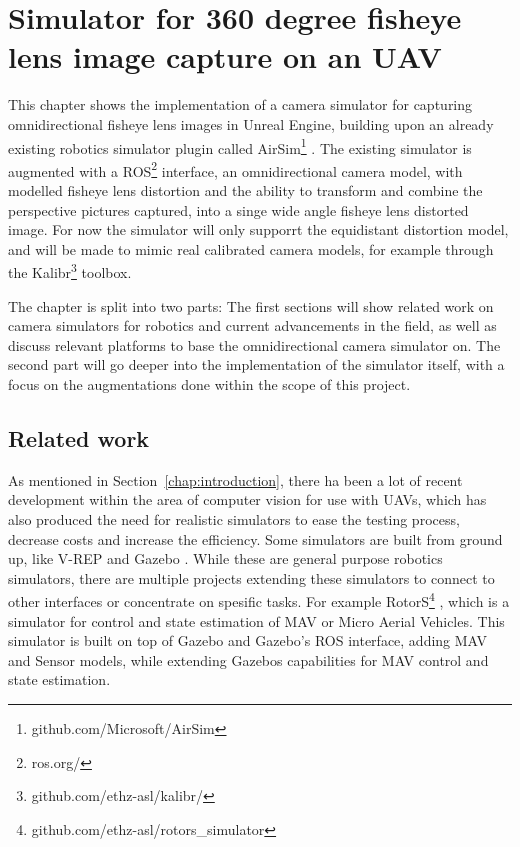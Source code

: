 
\chapter{Simulator for 360 degree fisheye lens image capture on an UAV}

This chapter shows the implementation of a camera simulator for capturing omnidirectional fisheye lens images in Unreal Engine, building upon an already existing robotics simulator plugin called AirSim\footnote{github.com/Microsoft/AirSim} \cite{Airsim_paper}. The existing simulator is augmented with a ROS\footnote{ros.org/} interface, an omnidirectional camera model, with modelled fisheye lens distortion and the ability to transform and combine the perspective pictures captured, into a singe wide angle fisheye lens distorted image. For now the simulator will only supporrt the equidistant distortion model, and will be made to mimic real calibrated camera models, for example through the Kalibr\footnote{github.com/ethz-asl/kalibr/} toolbox.

The chapter is split into two parts: The first sections will show related work on camera simulators for robotics and current advancements in the field, as well as discuss relevant platforms to base the omnidirectional camera simulator on. The second part will go deeper into the implementation of the simulator itself, with a focus on the augmentations done within the scope of this project.

\section{Related work} \label{sec:simulator_related}

As mentioned in Section~\ref{chap:introduction}, there ha been a lot of recent development within the area of computer vision for use with UAVs, which has also produced the need for realistic simulators to ease the testing process, decrease costs and increase the efficiency. Some simulators are built from ground up, like V-REP \cite{VREP2013} and Gazebo \cite{GazeboPaper}. While these are general purpose robotics simulators, there are multiple projects extending these simulators to connect to other interfaces or concentrate on spesific tasks. For example RotorS\footnote{github.com/ethz-asl/rotors\_simulator} \cite{RotorS}, which is a simulator for control and state estimation of MAV or Micro Aerial Vehicles. This simulator is built on top of Gazebo and Gazebo's ROS interface, adding MAV and Sensor models, while extending Gazebos capabilities for MAV control and state estimation.

